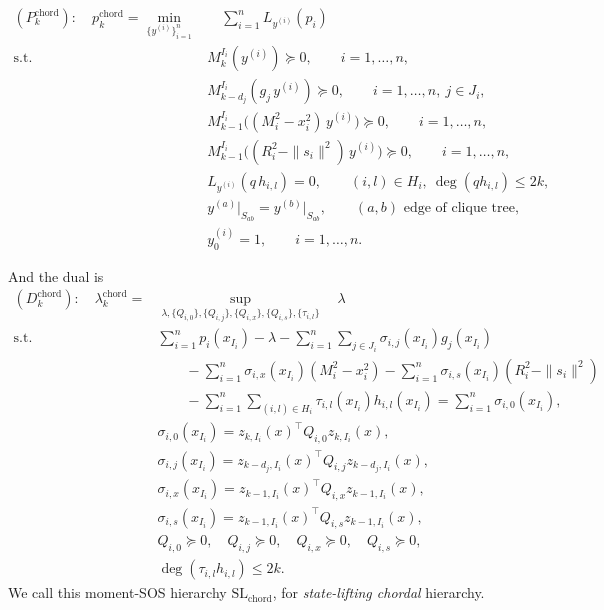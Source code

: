 \documentclass[11pt,a4paper]{article}
\theoremstyle{definition}
\begin{document}
\begin{equation}\label{eq:slmom-sdp}
\begin{aligned}
(P^{\mathrm{chord}}_k):\quad 
p^{\mathrm{chord}}_k = \min_{\{y^{(i)}\}_{i=1}^n}& \quad 
 \sum_{i=1}^n L_{y^{(i)}}(p_i) \\
\text{s.t.}\quad 
& M^{I_i}_k(y^{(i)}) \succeq 0, \qquad i=1,\dots,n, \\
& M^{I_i}_{k-d_j}(g_j\,y^{(i)}) \succeq 0, 
   \qquad i=1,\dots,n,\ j\in J_i, \\
& M^{I_i}_{k-1}\bigl((M_i^2-x_i^2)\,y^{(i)}\bigr) \succeq 0,
   \qquad i=1,\dots,n, \\
& M^{I_i}_{k-1}\bigl((R_i^2-\|s_i\|^2)\,y^{(i)}\bigr) \succeq 0,
   \qquad i=1,\dots,n, \\
& L_{y^{(i)}}(q\,h_{i,l}) = 0, 
   \qquad (i,l)\in H_i,\ \deg(qh_{i,l})\leq 2k, \\
& y^{(a)}\big|_{S_{ab}} = y^{(b)}\big|_{S_{ab}}, 
   \qquad (a,b)\text{ edge of clique tree}, \\
& y^{(i)}_0 = 1, \qquad i=1,\dots,n.
\end{aligned}
\end{equation}

And the dual is 
\begin{equation}\label{eq:slsos-sdp}
\begin{aligned}
(D^{\mathrm{chord}}_k):\quad 
\lambda^{\mathrm{chord}}_k 
= &\sup_{\lambda,\{Q_{i,0}\},\{Q_{i,j}\},\{Q_{i,x}\},\{Q_{i,s}\},\{\tau_{i,l}\}}
\quad  \lambda \\
\text{s.t.}\quad 
& \sum_{i=1}^n p_i(x_{I_i}) - \lambda
  - \sum_{i=1}^n \sum_{j\in J_i} \sigma_{i,j}(x_{I_i}) g_j(x_{I_i}) \\
& \qquad
  - \sum_{i=1}^n \sigma_{i,x}(x_{I_i}) (M_i^2-x_i^2)
  - \sum_{i=1}^n \sigma_{i,s}(x_{I_i}) (R_i^2-\|s_i\|^2) \\
& \qquad
  - \sum_{i=1}^n \sum_{(i,l)\in H_i}
    \tau_{i,l}(x_{I_i}) h_{i,l}(x_{I_i})
  = \sum_{i=1}^n \sigma_{i,0}(x_{I_i}), \\
& \sigma_{i,0}(x_{I_i})
  = z_{k,I_i}(x)^\top Q_{i,0} z_{k,I_i}(x), \\
& \sigma_{i,j}(x_{I_i})
  = z_{k-d_j,I_i}(x)^\top Q_{i,j} z_{k-d_j,I_i}(x), \\
& \sigma_{i,x}(x_{I_i})
  = z_{k-1,I_i}(x)^\top Q_{i,x} z_{k-1,I_i}(x), \\
& \sigma_{i,s}(x_{I_i})
  = z_{k-1,I_i}(x)^\top Q_{i,s} z_{k-1,I_i}(x), \\
& Q_{i,0} \succeq 0,\quad Q_{i,j}\succeq 0,\quad Q_{i,x}\succeq 0,\quad Q_{i,s}\succeq 0, \\
& \deg(\tau_{i,l} h_{i,l}) \leq 2k .
\end{aligned}
\end{equation}
We call this moment-SOS hierarchy $\mathrm{SL}_{\mathrm{chord}}$, for \emph{state-lifting chordal} hierarchy.
\end{document}
